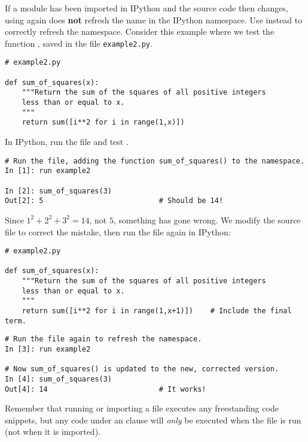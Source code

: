 \begin{warn} %
If a module has been imported in IPython and the source code then changes, using  again does \textbf{not} refresh the name in the IPython namespace.
Use  instead to correctly refresh the namespace.
Consider this example where we test the function , saved in the file \texttt{example2.py}.

\begin{lstlisting}
# example2.py

def sum_of_squares(x):
    """Return the sum of the squares of all positive integers
    less than or equal to x.
    """
    return sum([i**2 for i in range(1,x)])
\end{lstlisting}

In IPython, run the file and test .

\begin{lstlisting}
# Run the file, adding the function sum_of_squares() to the namespace.
In [1]: run example2

In [2]: sum_of_squares(3)
Out[2]: 5                           # Should be 14!
\end{lstlisting}

Since $1^2 + 2^2 + 3^2 = 14$, not $5$, something has gone wrong.
We modify the source file to correct the mistake, then run the file again in IPython:

\begin{lstlisting}
# example2.py

def sum_of_squares(x):
    """Return the sum of the squares of all positive integers
    less than or equal to x.
    """
    return sum([i**2 for i in range(1,x+1)])    # Include the final term.
\end{lstlisting}

\begin{lstlisting}
# Run the file again to refresh the namespace.
In [3]: run example2

# Now sum_of_squares() is updated to the new, corrected version.
In [4]: sum_of_squares(3)
Out[4]: 14                          # It works!
\end{lstlisting}

Remember that running or importing a file executes any freestanding code snippets, but any code under an  clause will \emph{only} be executed when the file is run (not when it is imported).
\end{warn}

